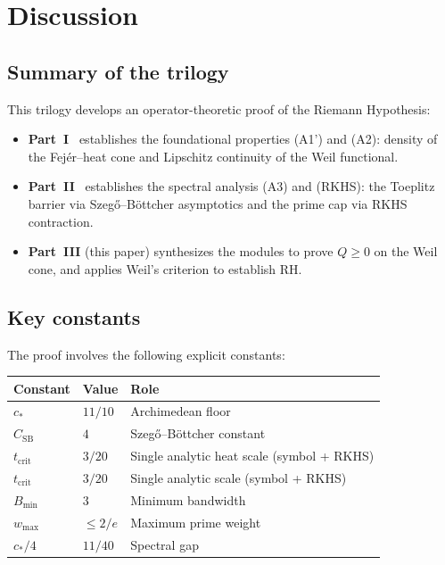 \documentclass[11pt,a4paper]{article}
\theoremstyle{definition}
\theoremstyle{remark}
\begin{document}
\section{Discussion}
\label{sec:discussion}

\subsection{Summary of the trilogy}

This trilogy develops an operator-theoretic proof of the Riemann Hypothesis:

\begin{itemize}
\item \textbf{Part~I}~\cite{PartI} establishes the foundational properties (A1') and (A2): density of the Fej\'er--heat cone and Lipschitz continuity of the Weil functional.

\item \textbf{Part~II}~\cite{PartII} establishes the spectral analysis (A3) and (RKHS): the Toeplitz barrier via Szeg\H{o}--B\"ottcher asymptotics and the prime cap via RKHS contraction.

\item \textbf{Part~III} (this paper) synthesizes the modules to prove $Q \geq 0$ on the Weil cone, and applies Weil's criterion to establish RH.
\end{itemize}

\subsection{Key constants}

The proof involves the following explicit constants:

\begin{center}
\begin{tabular}{@{}lll@{}}
\toprule
Constant & Value & Role \\
\midrule
$c_*$ & $11/10$ & Archimedean floor \\
$C_{\mathrm{SB}}$ & $4$ & Szeg\H{o}--B\"ottcher constant \\
$t_{\mathrm{crit}}$ & $3/20$ & Single analytic heat scale (symbol + RKHS) \\
$t_{\mathrm{crit}}$ & $3/20$ & Single analytic scale (symbol + RKHS) \\
$B_{\min}$ & $3$ & Minimum bandwidth \\
$w_{\max}$ & $\leq 2/e$ & Maximum prime weight \\
$c_*/4$ & $11/40$ & Spectral gap \\
\bottomrule
\end{tabular}
\end{center}
\end{document}

